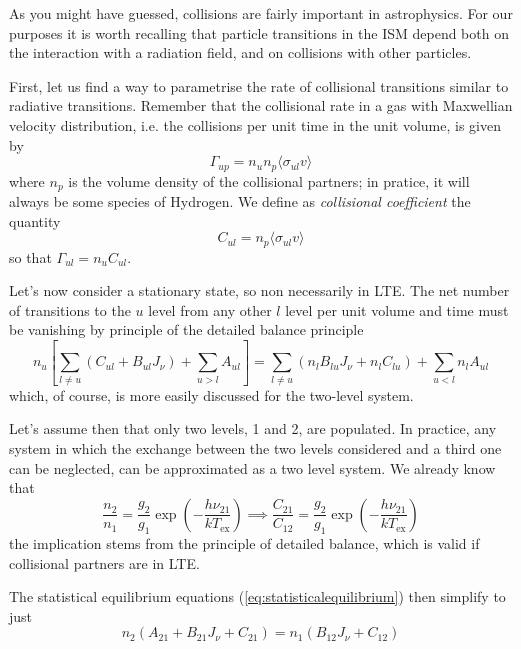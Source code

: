 As you might have guessed, collisions are fairly important in astrophysics. For our purposes it is worth recalling that particle transitions in the ISM depend both on the interaction with a radiation
field, and on collisions with other particles.
\par First, let us find a way to parametrise the rate of collisional transitions similar to radiative transitions. Remember that the collisional rate in a gas with Maxwellian velocity distribution,
i.e. the collisions per unit time in the unit volume, is given by
\begin{equation*}
    \Gamma_{up} = n_{u}n_{p}\langle \sigma_{ul} v \rangle 
\end{equation*}
where $n_{p}$ is the volume density of the collisional partners; in pratice, it will always be some species of Hydrogen. We define as \emph{collisional coefficient} the quantity 
\begin{equation}
    C_{ul} = n_{p}\langle \sigma_{ul} v \rangle 
\end{equation}
so that $\Gamma_{ul} = n_{u}C_{ul}$.
\par Let's now consider a stationary state, so non necessarily in LTE. The net number of transitions to the $u$ level from any other $l$ level per unit volume and time must be vanishing by principle of the detailed balance principle
\begin{equation}
    n_{u}\left[\sum_{l\neq u} (C_{ul}+B_{ul}J_{\nu}) + \sum_{u>l}A_{ul}\right] = \sum_{l\neq u}(n_{l}B_{lu}J_{\nu} + n_{l}C_{lu}) + \sum_{u<l}n_{l}A_{ul}
    \label{eq:statisticalequilibrium}
\end{equation}
which, of course, is more easily discussed for the two-level system.
\par Let's assume then that only two levels, 1 and 2, are populated. In practice, any system in which the exchange between the two levels considered and a third one can be neglected, can be approximated as a two level system. We already know that 
\begin{equation}
    \frac{n_{2}}{n_{1}} = \frac{g_{2}}{g_{1}}\exp\left(-\frac{h\nu_{21}}{kT_{\text{ex}}}\right) \implies \frac{C_{21}}{C_{12}} = \frac{g_{2}}{g_{1}}\exp\left(-\frac{h\nu_{21}}{kT_{\text{ex}}}\right)
\end{equation}
the implication stems from the principle of detailed balance, which is valid if collisional partners are in LTE.
\par The statistical equilibrium equations (\ref{eq:statisticalequilibrium}) then simplify to just 
\begin{equation}
    n_{2}(A_{21}+B_{21}J_{\nu}+C_{21}) = n_{1}(B_{12}J_{\nu}+C_{12})
\end{equation}
